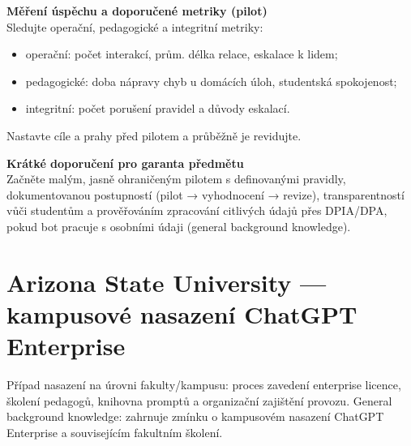 \documentclass{report}%
\begin{document}
\medskip
\textbf{Měření úspěchu a doporučené metriky (pilot)}\\
Sledujte operační, pedagogické a integritní metriky:
\begin{itemize}
  \item operační: počet interakcí, prům. délka relace, eskalace k lidem;
  \item pedagogické: doba nápravy chyb u domácích úloh, studentská spokojenost;
  \item integritní: počet porušení pravidel a důvody eskalací.
\end{itemize}
Nastavte cíle a prahy před pilotem a průběžně je revidujte.

\medskip
\textbf{Krátké doporučení pro garanta předmětu}\\
Začněte malým, jasně ohraničeným pilotem s definovanými pravidly, dokumentovanou postupností (pilot → vyhodnocení → revize), transparentností vůči studentům a prověřováním zpracování citlivých údajů přes DPIA/DPA, pokud bot pracuje s osobními údaji (general background knowledge).%

%
\section{Arizona State University — kampusové nasazení ChatGPT Enterprise}%
Případ nasazení na úrovni fakulty/kampusu: proces zavedení enterprise licence, školení pedagogů, knihovna promptů a organizační zajištění provozu. General background knowledge: zahrnuje zmínku o kampusovém nasazení ChatGPT Enterprise a souvisejícím fakultním školení.%
\end{document}
